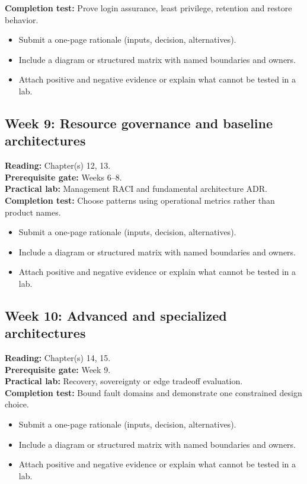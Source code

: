 \documentclass[10pt,letterpaper]{article}
\begin{document}
\textbf{Completion test:} Prove login assurance, least privilege, retention and restore behavior.
\begin{itemize}
\item Submit a one-page rationale (inputs, decision, alternatives).
\item Include a diagram or structured matrix with named boundaries and owners.
\item Attach positive and negative evidence or explain what cannot be tested in a lab.
\end{itemize}
\subsection{Week 9: Resource governance and baseline architectures}
\textbf{Reading:} Chapter(s) 12, 13.\\
\textbf{Prerequisite gate:} Weeks 6--8.\\
\textbf{Practical lab:} Management RACI and fundamental architecture ADR.\\
\textbf{Completion test:} Choose patterns using operational metrics rather than product names.
\begin{itemize}
\item Submit a one-page rationale (inputs, decision, alternatives).
\item Include a diagram or structured matrix with named boundaries and owners.
\item Attach positive and negative evidence or explain what cannot be tested in a lab.
\end{itemize}
\subsection{Week 10: Advanced and specialized architectures}
\textbf{Reading:} Chapter(s) 14, 15.\\
\textbf{Prerequisite gate:} Week 9.\\
\textbf{Practical lab:} Recovery, sovereignty or edge tradeoff evaluation.\\
\textbf{Completion test:} Bound fault domains and demonstrate one constrained design choice.
\begin{itemize}
\item Submit a one-page rationale (inputs, decision, alternatives).
\item Include a diagram or structured matrix with named boundaries and owners.
\item Attach positive and negative evidence or explain what cannot be tested in a lab.
\end{itemize}
\end{document}
